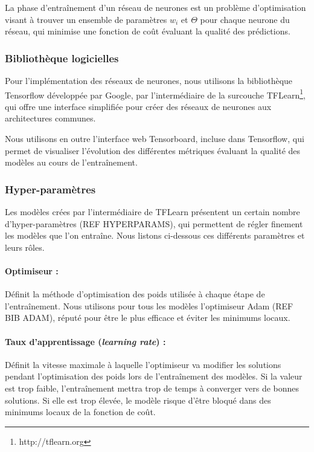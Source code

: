 \par La phase d'entraînement d'un réseau de neurones est un problème d'optimisation visant à trouver un ensemble de paramètres $w_i$ et $\Theta$ pour chaque neurone du réseau, qui minimise une fonction de coût évaluant la qualité des prédictions.

\subsubsection{Bibliothèque logicielles}

\par Pour l'implémentation des réseaux de neurones, nous utilisons la bibliothèque Tensorflow\cite{tf} développée par Google, par l'intermédiaire de la surcouche TFLearn\footnote{http://tflearn.org}, qui offre une interface simplifiée pour créer des réseaux de neurones aux architectures communes.\\

\par Nous utilisons en outre l'interface web Tensorboard, incluse dans Tensorflow, qui permet de visualiser l'évolution des différentes métriques évaluant la qualité des modèles au cours de l'entraînement.

\subsubsection{Hyper-paramètres}

\par Les modèles crées par l'intermédiaire de TFLearn présentent un certain nombre d'hyper-paramètres (REF HYPERPARAMS), qui permettent de régler finement les modèles que l'on entraîne. Nous listons ci-dessous ces différents paramètres et leurs rôles.

\paragraph{Optimiseur : } Définit la méthode d'optimisation des poids utilisée à chaque étape de l'entraînement. Nous utilisons pour tous les modèles l'optimiseur Adam (REF BIB ADAM), réputé pour être le plus efficace et éviter les minimums locaux.

\paragraph{Taux d'apprentissage (\emph{learning rate}) : } Définit la vitesse maximale à laquelle l'optimiseur va modifier les solutions pendant l'optimisation des poids lors de l'entraînement des modèles. Si la valeur est trop faible, l'entraînement mettra trop de temps à converger vers de bonnes solutions. Si elle est trop élevée, le modèle risque d'être bloqué dans des minimums locaux de la fonction de coût.

